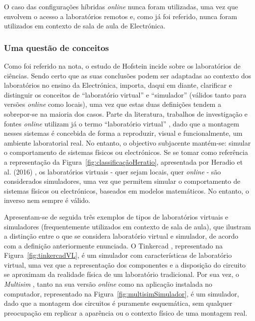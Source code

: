 O caso das configurações híbridas \textit{online} nunca foram utilizadas, uma vez que envolvem o acesso a laboratórios remotos e, como já foi referido, nunca foram utilizados  em contexto de sala de aula de Electrónica.

\subsubsection{Uma questão de conceitos}
\label{sec:questaodeconceitos}
Como foi referido na nota, o estudo de Hofstein incide sobre os laboratórios de ciências. Sendo certo que as suas conclusões podem ser adaptadas ao contexto dos laboratórios no ensino da Electrónica, importa, daqui em diante, clarificar e distinguir os conceitos de ``laboratório virtual'' e ``simulador'' (válidos tanto para versões \textit{online} como locais), uma vez que estas duas definições tendem a sobrepor-se na maioria dos casos. Parte da literatura, trabalhos de investigação e fontes \textit{online} utilizam já o termo ``laboratório virtual'' \cite{BRINSON2015218, virtuallabng, EMaster2024May}, dado que a montagem nesses sistemas é concebida de forma a reproduzir, visual e funcionalmente, um ambiente laboratorial real. No entanto, o objectivo subjacente mantém-se: simular o comportamento de sistemas físicos ou electrónicos. Se se tomar como referência a representação da Figura~\ref{fig:classificaçãoHeratio}, apresentada por Heradio et al. (2016) \cite{HERADIO20161}, os laboratórios virtuais - quer sejam locais, quer \textit{online} - são considerados simuladores, uma vez que permitem simular o comportamento de sistemas físicos ou electrónicos, baseados em modelos matemáticos. No entanto, o inverso nem sempre é válido.

Apresentam-se de seguida três exemplos de tipos de laboratórios virtuais e simuladores (frequentemente utilizados em contexto de sala de aula), que ilustram a distinção entre o que se considera laboratório virtual e simulador, de acordo com a definição anteriormente enunciada. O Tinkercad \cite{tinkercad}, representado na Figura~\ref{fig:tinkercadVL}, é um simulador com características de laboratório virtual, uma vez que a representação dos componentes e a disposição do circuito se aproximam da realidade física de um laboratório tradicional. Por sua vez, o \textit{Multisim} \cite{multisim}, tanto na sua versão \textit{online} como na aplicação instalada no computador, representado na Figura~\ref{fig:multisimSimulador}, é um simulador, dado que a montagem dos circuitos é puramente esquemática, sem qualquer preocupação em replicar a aparência ou o contexto físico de uma montagem real.

